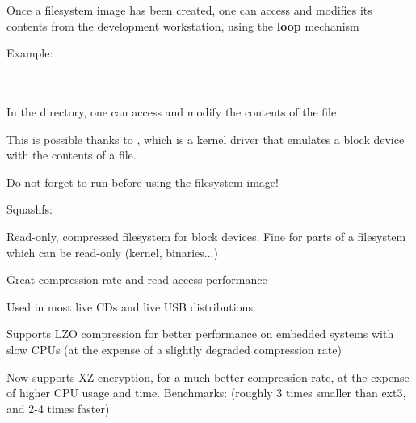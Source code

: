   \startitemize
  \item Once a filesystem image has been created, one can access and
    modifies its contents from the development workstation, using the
    {\bf loop} mechanism
  \item Example:\\
    \\
    \\
  \item In the  directory, one can access and modify
    the contents of the  file.
  \item This is possible thanks to , which is a kernel
    driver that emulates a block device with the contents of a file.
  \item Do not forget to run  before using the filesystem
    image!
  \stopitemize

  Squashfs: 
  \startitemize
  \item Read-only, compressed filesystem for block devices. Fine for
    parts of a filesystem which can be read-only (kernel, binaries...)
  \item Great compression rate and read access performance
  \item Used in most live CDs and live USB distributions
  \item Supports LZO compression for better performance on embedded
    systems with slow CPUs (at the expense of a slightly degraded
    compression rate)
  \item Now supports XZ encryption, for a much better compression rate,
        at the expense of higher CPU usage and time.
  \stopitemize
  Benchmarks: (roughly 3 times smaller than ext3, and 2-4 times faster)\\

